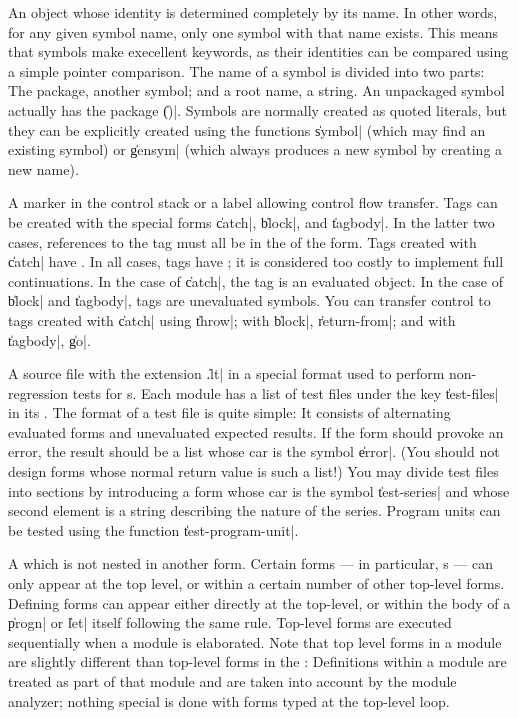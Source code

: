 \begin{description}
	{An object whose identity is determined completely by its
	name.  In other words, for any given symbol name, only one
	symbol with that name exists.  This means that symbols make
	execellent keywords, as their identities can be compared using
	a simple pointer comparison.  The name of a symbol is divided
	into two parts:  The package, another symbol; and a root name,
	a string.  An unpackaged symbol actually has the package
	\|()|.  Symbols are normally created as quoted literals, but
	they can be explicitly created using the functions \|symbol|
	(which may find an existing symbol) or \|gensym| (which always
	produces a new symbol by creating a new name).}

	{A marker in the control stack or a label allowing control
	flow transfer.  Tags can be created with the special forms
	\|catch|, \|block|, and \|tagbody|.  In the latter two cases,
	references to the tag must all be in the 
	of the form.  Tags created with \|catch| have .  In all cases, tags have ; it is
	considered too costly to implement full continuations.  In the
	case of \|catch|, the tag is an evaluated object.  In the case
	of \|block| and \|tagbody|, tags are unevaluated symbols.  You
	can transfer control to tags created with \|catch| using
	\|throw|; with \|block|, \|return-from|; and with \|tagbody|,
	\|go|.}

	{A source file with the extension \|.lt| in a special format
	used to perform non-regression tests for s.  Each
	module has a list of test files under the key \|test-files| in
	its .  The format of a
	test file is quite simple:  It consists of alternating
	evaluated forms and unevaluated expected results.  If the form
	should provoke an error, the result should be a list whose car
	is the symbol \|error|.  (You should not design forms whose
	normal return value is such a list!)  You may divide test
	files into sections by introducing a form whose car is the
	symbol \|test-series| and whose second element is a string
	describing the nature of the series.  Program units can be
	tested using the function \|test-program-unit|.}

	{A  which is not nested in another form.  Certain
	forms --- in particular, s --- can only
	appear at the top level, or within a certain number of other
	top-level forms.  Defining forms can appear either directly at
	the top-level, or within the body of a \|progn| or \|let|
	itself following the same rule.  Top-level forms are executed
	sequentially when a module is elaborated.  Note that top level
	forms in a module are slightly different than top-level forms
	in the : Definitions within a module are
	treated as part of that module and are taken into account by
	the module analyzer; nothing special is done with forms typed
	at the top-level loop.}


\end{description}
